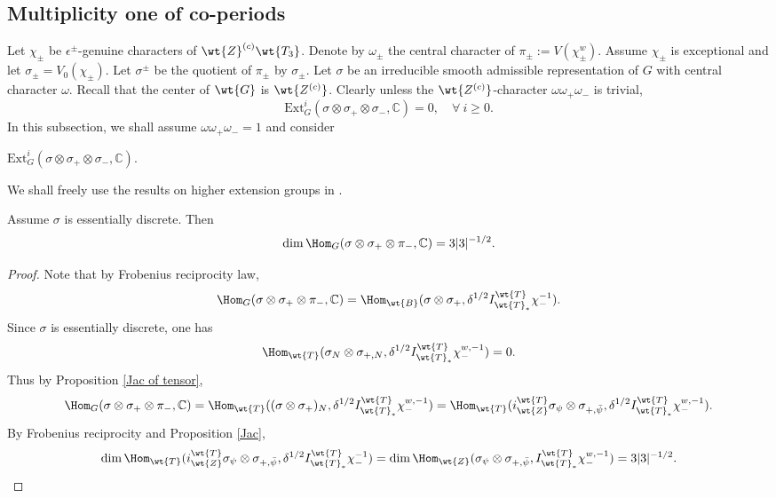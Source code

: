 \documentclass[11pt,reqno]{amsart}
\newcommand{\BC}{{\mathbb {C}}} \newcommand{\BD}{{\mathbb {D}}}
\newcommand{\Ext}{{\mathrm{Ext}}}
\theoremstyle{plain}
\theoremstyle{remark} \newtheorem{remark}[thm]{Remark}
\theoremstyle{definition} \newtheorem{exercise}[thm]{Exercise}
\theoremstyle{definition} \newtheorem{example}[thm]{Example} \newtheorem{condition}[thm]{Condition}
\numberwithin{equation}{section}
\renewcommand{\-}{\text{--}}
\begin{document}
\subsection{Multiplicity one of   co-periods}\label{Mul-one}
 Let $\chi_\pm$ be $\epsilon^\pm$-genuine characters of $\wt{Z}^{(c)}\wt{T_3}$.  Denote by $\omega_\pm$  the central character of $\pi_\pm:=V(\chi^w_\pm)$. Assume $\chi_{\pm}$ is exceptional and let $\sigma_\pm=V_0(\chi_\pm)$. Let $\sigma^{\pm}$ be the quotient of $\pi_{\pm}$ by $\sigma_{\pm}$. 
 Let $\sigma$ be an irreducible smooth admissible representation of $G$  with central character $\omega$. Recall that the center of $\wt{G}$ is $\wt{Z^{(c)}}$. Clearly unless the $\wt{Z^{(c)}}$-character $\omega\omega_+\omega_-$ is trivial, 
\[\Ext^i_G(\sigma \otimes \sigma_+ \otimes \sigma_-, \BC)=0,\quad \forall\ i\geq0. \]
In this subsection, we shall  assume $\omega\omega_+\omega_- = 1$ and consider \begin{center}
    $\Ext^i_G(\sigma \otimes\sigma_+ \otimes \sigma_-, \BC)$.
\end{center} 
We shall freely use the results on higher extension groups in \cite{Pra18, FP22}.
\begin{prop}\label{ub}Assume  $\sigma$ is essentially discrete. Then $$\dim\Hom_G(\sigma\otimes \sigma_+\otimes \pi_-,\BC)=3|3|^{-1/2}.$$

\end{prop}
\begin{proof}
Note that by Frobenius reciprocity law, 
$$\Hom_G(\sigma\otimes \sigma_+\otimes \pi_-,\BC)=\Hom_{\wt{B}}(\sigma\otimes \sigma_+, \delta^{1/2}I_{\wt{T}_*}^{\wt{T}}\chi_-^{-1}).$$
Since  $\sigma$ is essentially discrete, one has \[\Hom_{\wt{T}}(\sigma_N\otimes \sigma_{+,N} , \delta^{1/2}I_{\wt{T}_*}^{\wt{T}}\chi_{-}^{w,-1})=0.\]
Thus by  Proposition \ref{Jac of tensor},
$$\Hom_G(\sigma\otimes \sigma_+\otimes \pi_-,\BC)=\Hom_{\wt{T}}((\sigma\otimes \sigma_+)_N, \delta^{1/2}I_{\wt{T}_*}^{\wt{T}}\chi_{-}^{w,-1})=\Hom_{\wt{T}}(i_{\wt{Z}}^{\wt{T}}\sigma_\psi\otimes\sigma_{+,\bar{\psi}}, \delta^{1/2}I_{\wt{T}_*}^{\wt{T}}\chi_{-}^{w,-1}).$$
By Frobenius reciprocity and Proposition \ref{Jac}, \[\dim\Hom_{\wt{T}}(i_{\wt{Z}}^{\wt{T}}\sigma_\psi\otimes\sigma_{+,\bar{\psi}}, \delta^{1/2}I_{\wt{T}_*}^{\wt{T}}\chi_{-}^{-1})=\dim\Hom_{\wt{Z}}(\sigma_\psi\otimes\sigma_{+,\bar{\psi}}, I_{\wt{T}_*}^{\wt{T}}\chi_{-}^{w,-1})=3|3|^{-1/2}.\]
\end{proof}
\end{document}
